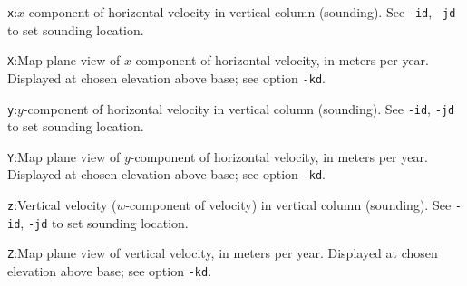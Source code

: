 \documentclass[11pt,final]{amsart}
\begin{document}
\verb|x|:\quad $x$-component of horizontal velocity in vertical column (sounding).  See \verb|-id|, \verb|-jd| to set sounding location.

\verb|X|:\quad Map plane view of $x$-component of horizontal velocity, in meters per year.  Displayed at chosen elevation above base; see option \verb|-kd|.

\verb|y|:\quad $y$-component of horizontal velocity in vertical column (sounding).  See \verb|-id|, \verb|-jd| to set sounding location.

\verb|Y|:\quad Map plane view of $y$-component of horizontal velocity, in meters per year.  Displayed at chosen elevation above base; see option \verb|-kd|.

\verb|z|:\quad Vertical velocity ($w$-component of velocity) in vertical column (sounding).  See \verb|-id|, \verb|-jd| to set sounding location.

\verb|Z|:\quad Map plane view of vertical velocity, in meters per year.  Displayed at chosen elevation above base; see option \verb|-kd|.


\end{document}
